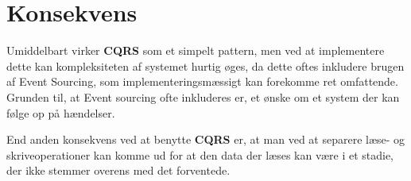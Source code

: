 \section{Konsekvens}
Umiddelbart virker \textbf{CQRS} som et simpelt pattern, men ved at implementere dette kan kompleksiteten af systemet hurtig øges, da dette oftes inkludere brugen af Event Sourcing, som implementeringsmæssigt kan forekomme ret omfattende. Grunden til, at Event sourcing ofte inkluderes er, et ønske om et system der kan følge op på hændelser.

End anden konsekvens ved at benytte \textbf{CQRS} er, at man ved at separere læse- og skriveoperationer kan komme ud for at den data der læses kan være i et stadie, der ikke stemmer overens med det forventede.


